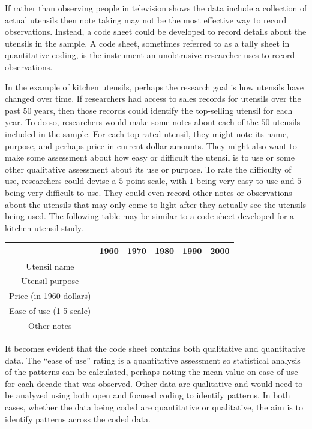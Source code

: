 If rather than observing people in television shows the data include a collection of actual utensils then note taking may not be the most effective way to record observations. Instead, a code sheet could be developed to record details about the utensils in the sample. A code sheet, sometimes referred to as a tally sheet in quantitative coding, is the instrument an unobtrusive researcher uses to record observations.

In the example of kitchen utensils, perhaps the research goal is how utensils have changed over time. If researchers had access to sales records for utensils over the past $ 50 $ years, then those records could identify the top-selling utensil for each year. To do so, researchers would make some notes about each of the $ 50 $ utensils included in the sample. For each top-rated utensil, they might note its name, purpose, and perhaps price in current dollar amounts. They might also want to make some assessment about how easy or difficult the utensil is to use or some other qualitative assessment about its use or purpose. To rate the difficulty of use, researchers could devise a $ 5 $-point scale, with $ 1 $ being very easy to use and $ 5 $ being very difficult to use. They could even record other notes or observations about the utensils that may only come to light after they actually see the utensils being used. The following table may be similar to a code sheet developed for a kitchen utensil study. 

\bigskip
\begin{tabular}{|c|c|c|c|c|c|}
	\hline 
	& 1960  & 1970 & 1980 & 1990 & 2000 \\ 
	\hline 
	Utensil name &  &  &  &  &  \\ 
	\hline 
	Utensil purpose &  &  &  &  &  \\ 
	\hline 
	Price (in 1960 dollars) &  &  &  &  &  \\ 
	\hline 
	Ease of use (1-5 scale) &  &  &  &  &  \\ 
	\hline 
	Other notes &  &  &  &  &  \\ 
	\hline 
\end{tabular}  
\bigskip

It becomes evident that the code sheet contains both qualitative and quantitative data. The ``ease of use'' rating is a quantitative assessment so statistical analysis of the patterns can be calculated, perhaps noting the mean value on ease of use for each decade that was observed. Other data are qualitative and would need to be analyzed using both open and focused coding to identify patterns. In both cases, whether the data being coded are quantitative or qualitative, the aim is to identify patterns across the coded data.

